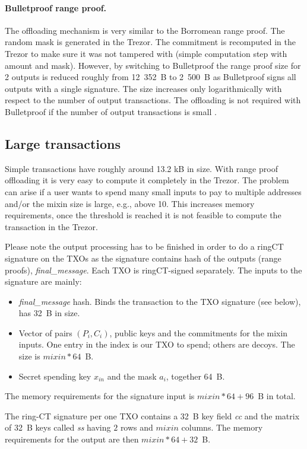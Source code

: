 \documentclass[]{article}
\begin{document}
\paragraph{Bulletproof range proof.} The offloading mechanism is very similar to the Borromean range proof. The random mask is generated in the Trezor. The commitment is recomputed in the Trezor to make sure it was not tampered with (simple computation step with amount and mask). 
However, by switching to Bulletproof the range proof size for 2 outputs is reduced roughly from 12~352~B to 2~500~B as Bulletproof signs all outputs with a single signature. The size increases only logarithmically with respect to the number of output transactions. The offloading is not required with Bulletproof if the number of output transactions is small \cite{Bnz2017BulletproofsSP}.

\subsection{Large transactions}
Simple transactions have roughly around 13.2 kB in size. With range proof offloading it is very easy to compute it completely in the Trezor. The problem can arise if a user wants to spend many small inputs to pay to multiple addresses and/or the mixin size is large, e.g., above 10. This increases memory requirements, once the threshold is reached it is not feasible to compute the transaction in the Trezor.

Please note the output processing has to be finished in order to do a ringCT signature on the TXOs as the signature contains hash of the outputs (range proofs), \emph{final\_message}. Each TXO is ringCT-signed separately. The inputs to the signature are mainly:

\begin{itemize}
	\item \emph{final\_message} hash. Binds the transaction to the TXO signature (see below), has 32~B in size.
    \item Vector of pairs $(P_i, C_i)$, public keys and the commitments for the mixin inputs. One entry in the index is our TXO to spend; others are decoys. The size is $mixin * 64$~B.
	\item Secret spending key $x_{in}$ and the mask $a_i$, together 64~B.
\end{itemize}
The memory requirements for the signature input is $mixin * 64 + 96$~B in total.

The ring-CT signature per one TXO contains a 32~B key field \emph{cc} and the matrix of 32~B keys called \emph{ss} having $2$ rows and $mixin$ columns. The memory requirements for the output are then $mixin * 64 + 32$~B.
\end{document}
